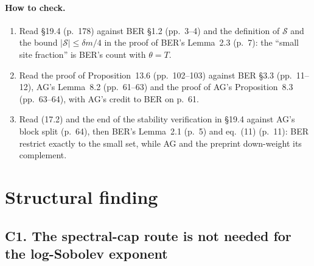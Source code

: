 \documentclass[11pt]{article}
\newcommand{\ploc}[2]{#1}
\begin{document}
\paragraph{How to check.}
\begin{enumerate}
\item Read \ploc{\S19.4 (p.~178)}{cap-entropy.tex:530--549} against BER \S1.2
 (pp.~3--4) and the definition of $\mathcal S$ and the bound
 $|\mathcal S|\le\delta m/4$ in the proof of BER's Lemma~2.3 (p.~7): the
 ``small site fraction'' is BER's count with $\theta=T$.
\item Read \ploc{the proof of Proposition~13.6 (pp.~102--103)}{profile-positive.tex:1600--1686}
 against BER \S3.3 (pp.~11--12), AG's
 \ploc{Lemma~8.2 (pp.~61--63)}{terminal.tex:225--327} and
 \ploc{the proof of AG's Proposition~8.3 (pp.~63--64)}{terminal.tex:370--412},
 with AG's credit to BER \ploc{on p.~61}{terminal.tex:217--223}.
\item Read \ploc{(17.2)}{cap-classical.tex:27--38} and
 \ploc{the end of the stability verification in \S19.4}{cap-entropy.tex:539--543}
 against \ploc{AG's block split (p.~64)}{terminal.tex:397--412}, then BER's
 Lemma~2.1 (p.~5) and eq.~(11) (p.~11): BER restrict exactly to the small
 set, while AG and the preprint down-weight its complement.
\end{enumerate}

\section{Structural finding}\label{sec:structural}
\subsection{C1. The spectral-cap route is not needed for the log-Sobolev exponent}\label{f:C1}
\end{document}
